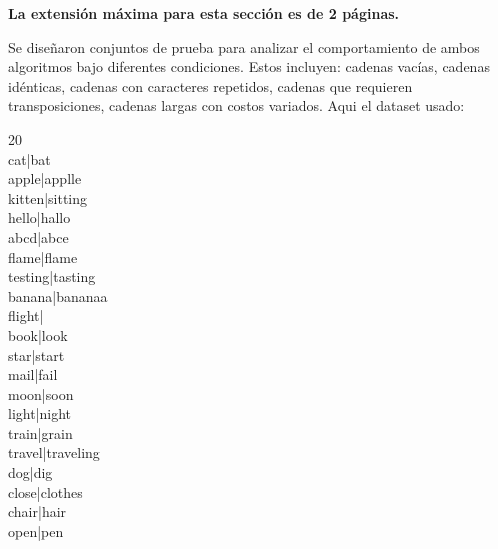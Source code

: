 \begin{mdframed}
    \textbf{La extensión máxima para esta sección es de 2 páginas.}
\end{mdframed}

Se diseñaron conjuntos de prueba para analizar el comportamiento de ambos algoritmos bajo diferentes condiciones. Estos incluyen: cadenas vacías, cadenas idénticas, cadenas con caracteres repetidos, cadenas que requieren transposiciones, cadenas largas con costos variados. Aqui el dataset usado:

\begin{mdframed}
20 \\
cat|bat\\
apple|applle\\
kitten|sitting\\
hello|hallo\\
abcd|abce\\
flame|flame\\
testing|tasting\\
banana|bananaa\\
flight|\\
book|look\\
star|start\\
mail|fail\\
moon|soon\\
light|night\\
train|grain\\
travel|traveling\\
dog|dig\\
close|clothes\\
chair|hair\\
open|pen\\

\end{mdframed}    
